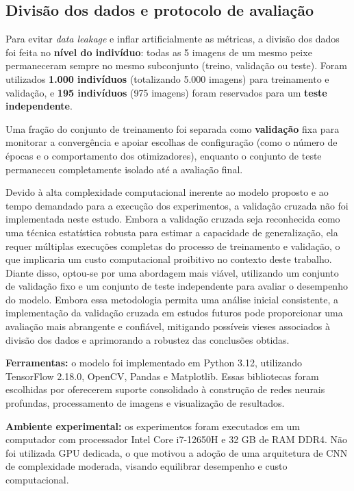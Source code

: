 \documentclass[sigconf,nonacm,screen]{acmart}
\begin{document}
\subsection{Divisão dos dados e protocolo de avaliação}
Para evitar \textit{data leakage} e inflar artificialmente as métricas, a divisão dos dados foi feita no \textbf{nível do indivíduo}: todas as 5 imagens de um mesmo peixe permaneceram sempre no mesmo subconjunto (treino, validação ou teste). 
Foram utilizados \textbf{1.000 indivíduos} (totalizando 5.000 imagens) para treinamento e validação, e \textbf{195 indivíduos} (975 imagens) foram reservados para um \textbf{teste independente}.

Uma fração do conjunto de treinamento foi separada como \textbf{validação} fixa para monitorar a convergência e apoiar escolhas de configuração (como o número de épocas e o comportamento dos otimizadores), enquanto o conjunto de teste permaneceu completamente isolado até a avaliação final.

Devido à alta complexidade computacional inerente ao modelo proposto e ao tempo demandado para a execução dos experimentos, a validação cruzada não foi implementada neste estudo. Embora a validação cruzada seja reconhecida como uma técnica estatística robusta para estimar a capacidade de generalização, ela requer múltiplas execuções completas do processo de treinamento e validação, o que implicaria um custo computacional proibitivo no contexto deste trabalho. Diante disso, optou-se por uma abordagem mais viável, utilizando um conjunto de validação fixo e um conjunto de teste independente para avaliar o desempenho do modelo. Embora essa metodologia permita uma análise inicial consistente, a implementação da validação cruzada em estudos futuros pode proporcionar uma avaliação mais abrangente e confiável, mitigando possíveis vieses associados à divisão dos dados e aprimorando a robustez das conclusões obtidas.

\textbf{Ferramentas:} o modelo foi implementado em Python 3.12, utilizando TensorFlow 2.18.0, OpenCV, Pandas e Matplotlib. Essas bibliotecas foram escolhidas por oferecerem suporte consolidado à construção de redes neurais profundas, processamento de imagens e visualização de resultados.

\textbf{Ambiente experimental:} os experimentos foram executados em um computador com processador Intel Core i7-12650H e 32 GB de RAM DDR4. Não foi utilizada GPU dedicada, o que motivou a adoção de uma arquitetura de CNN de complexidade moderada, visando equilibrar desempenho e custo computacional.
\end{document}

